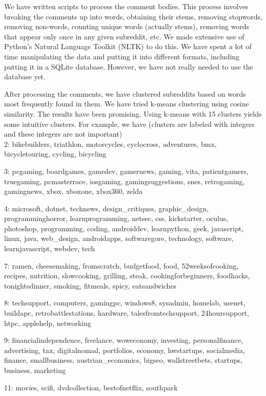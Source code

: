 \documentclass[letterpaper]{article}
\numberwithin{equation}{subsection}
\begin{document}
We have written scripts to process the comment bodies. This process involves breaking the comments up into words, obtaining their stems, removing stopwords, removing non-words, counting unique words (actually stems), removing words that appear only once in any given subreddit, etc. We made extensive use of Python's Natural Language Toolkit (NLTK) to do this. We have spent a lot of time manipulating the data and putting it into different formats, including putting it in a SQLite database. However, we have not really needed to use the database yet.

After processing the comments, we have clustered subreddits based on words most frequently found in them. We have tried k-means clustering using cosine similarity. The results have been promising. Using k-means with 15 clusters yields some intuitive clusters. For example, we have (clusters are labeled with integers and these integers are not important)
\text{}\\

2:    bikebuilders, triathlon, motorcycles, cyclocross, adventures, bmx, bicycletouring, cycling, bicycling

3:    pcgaming, boardgames, gamedev, gamernews, gaming, vita, patientgamers, truegaming, pcmasterrace, iosgaming, gamingsuggestions, snes, retrogaming, gamingnews, xbox, xboxone, xbox360, zelda

4:    microsoft, dotnet, technews, design\_critiques, graphic\_design, programminghorror, learnprogramming, netsec, css, kickstarter, oculus, photoshop, programming, coding, androiddev, learnpython, geek, javascript, linux, java, web\_design, androidapps, softwaregore, technology, software, learnjavascript, webdev, tech

7:    ramen, cheesemaking, fromscratch, budgetfood, food, 52weeksofcooking, recipes, nutrition, slowcooking, grilling, steak, cookingforbeginners, foodhacks, tonightsdinner, smoking, fitmeals, spicy, eatsandwiches

8:    techsupport, computers, gamingpc, windows8, sysadmin, homelab, usenet, buildapc, retrobattlestations, hardware, talesfromtechsupport, 24hoursupport, htpc, applehelp, networking

9:    financialindependence, freelance, woweconomy, investing, personalfinance, advertising, tax, digitalnomad, portfolios, economy, hwstartups, socialmedia, finance, smallbusiness, austrian\_economics, bigseo, wallstreetbets, startups, business, marketing

11:    movies, scifi, dvdcollection, bestofnetflix, southpark
\end{document}
